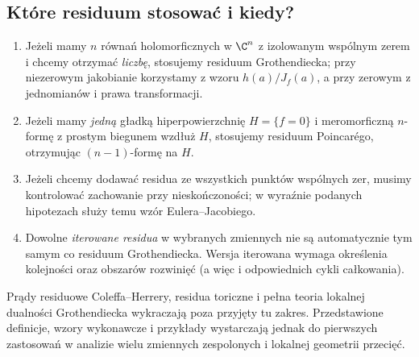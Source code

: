 \subsection{Które residuum stosować i kiedy?}
\begin{enumerate}[label=\arabic*)]
\item Jeżeli mamy $n$ równań holomorficznych w $\C^n$ z izolowanym
wspólnym zerem i chcemy otrzymać \emph{liczbę}, stosujemy residuum
Grothendiecka; przy niezerowym jakobianie korzystamy z wzoru
$h(a)/J_f(a)$, a przy zerowym z jednomianów i prawa transformacji.
\item Jeżeli mamy \emph{jedną} gładką hiperpowierzchnię $H=\{f=0\}$
i meromorficzną $n$-formę z prostym biegunem wzdłuż $H$,
stosujemy residuum Poincarégo, otrzymując $(n-1)$-formę na $H$.
\item Jeżeli chcemy dodawać residua ze wszystkich punktów wspólnych
zer, musimy kontrolować zachowanie przy nieskończoności;
w wyraźnie podanych hipotezach służy temu wzór Eulera--Jacobiego.
\item Dowolne \emph{iterowane residua} w wybranych zmiennych nie są
automatycznie tym samym co residuum Grothendiecka.
Wersja iterowana wymaga określenia kolejności oraz
obszarów rozwinięć (a więc i odpowiednich cykli całkowania).
\end{enumerate}

\begin{uwaga}
Prądy residuowe Coleffa--Herrery, residua toriczne i
pełna teoria lokalnej dualności Grothendiecka wykraczają
poza przyjęty tu zakres. Przedstawione definicje, wzory
wykonawcze i przykłady wystarczają jednak do pierwszych
zastosowań w analizie wielu zmiennych zespolonych
i lokalnej geometrii przecięć.
\end{uwaga}


